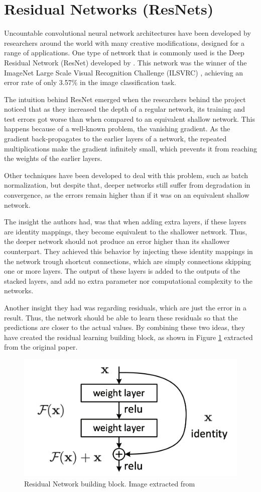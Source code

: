 \section{Residual Networks (ResNets)}

Uncountable convolutional neural network architectures have been developed by researchers around the world with many creative modifications, designed for a range of applications. One type of network that is commonly used is the Deep Residual Network (ResNet) developed by \cite{ParkhiVZ15}. This network was the winner of the ImageNet Large Scale Visual Recognition Challenge (ILSVRC) \citep{ILSVRC15}, achieving an error rate of only 3.57\% in the image classification task.

The intuition behind ResNet emerged when the researchers behind the project noticed that as they increased the depth of a regular network, its training and test errors got worse than when compared to an equivalent shallow network. This happens because of a well-known problem, the vanishing gradient. As the gradient back-propagates to the earlier layers of a network, the repeated multiplications make the gradient infinitely small, which prevents it from reaching the weights of the earlier layers.

Other techniques have been developed to deal with this problem, such as batch normalization, but despite that, deeper networks still suffer from degradation in convergence, as the errors remain higher than if it was on an equivalent shallow network.

The insight the authors had, was that when adding extra layers, if these layers are identity mappings, they become equivalent to the shallower network. Thus, the deeper network should not produce an error higher than its shallower counterpart. They achieved this behavior by injecting these identity mappings in the network trough shortcut connections, which are simply connections skipping one or more layers. The output of these layers is added to the outputs of the stacked layers, and add no extra parameter nor computational complexity to the networks.

Another insight they had was regarding residuals, which are just the error in a result. Thus, the network should be able to learn these residuals so that the predictions are closer to the actual values. By combining these two ideas, they have created the residual learning building block, as shown in Figure \ref{fig:building_block} extracted from the original paper.

\begin{figure}[h!tp]
    \centering
    \includegraphics[width=.5\textwidth]{imgs/chap5_building_block.png}
    \caption[Residual Network building block.]{Residual Network building block. Image extracted from \cite{ParkhiVZ15}}
    \label{fig:building_block}
\end{figure}

